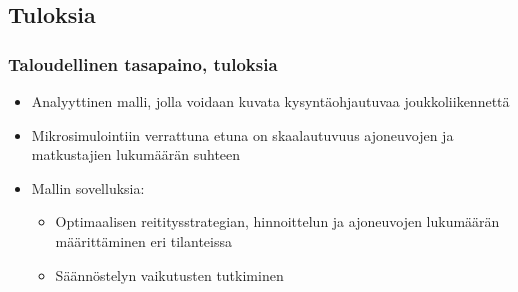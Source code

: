 \documentclass{beamer}
\begin{document}
% 
    






 



\subsection{Tuloksia}
\begin{frame}
  \frametitle{Taloudellinen tasapaino, tuloksia}   %
\begin{itemize}
\item
Analyyttinen malli, jolla voidaan kuvata kysyntäohjautuvaa joukkoliikennettä 
\item
Mikrosimulointiin verrattuna etuna on skaalautuvuus ajoneuvojen ja matkustajien lukumäärän suhteen
\item
Mallin sovelluksia:
\begin{itemize}
 \item 
Optimaalisen reititysstrategian, hinnoittelun ja ajoneuvojen lukumäärän määrittäminen eri tilanteissa
\item
Säännöstelyn vaikutusten tutkiminen 
\end{itemize}
\end{itemize}
\end{frame}
\end{document}
